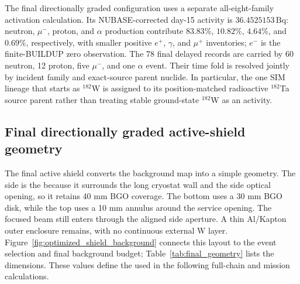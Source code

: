 \documentclass[11pt]{article}
\begin{document}
The final directionally graded configuration uses a separate all-eight-family
activation calculation.
Its NUBASE-corrected day-15 activity is $36.4525153\,\mathrm{Bq}$: neutron,
$\mu^-$, proton, and $\alpha$ production contribute $83.83\%$, $10.82\%$,
$4.64\%$, and $0.69\%$, respectively, with smaller positive $e^+$, $\gamma$,
and $\mu^+$ inventories; $e^-$ is the finite-BUILDUP zero observation. The 78
final delayed records are carried by 60 neutron, 12 proton, five $\mu^-$, and one
$\alpha$ event. Their time fold is resolved jointly by incident family and
exact-source parent nuclide. In particular, the one SIM lineage that starts as
$^{182}$W is assigned to its position-matched radioactive $^{182}$Ta source
parent rather than treating stable ground-state $^{182}$W as an activity.

\FloatBarrier

\subsection{Final directionally graded active-shield geometry}
\label{subsec:optimized_shield_results}

The final active shield converts the background map into a simple geometry. The side
is the  because it surrounds the long cryostat wall
and the side optical opening, so it retains 40 mm BGO coverage. The bottom uses a
30 mm BGO disk, while the top uses a 10 mm annulus around the service opening.
The focused beam still enters through the aligned side aperture. A thin Al/Kapton
outer enclosure remains, with no continuous external W layer.
Figure~\ref{fig:optimized_shield_background} connects this layout to the event
selection and final background budget; Table~\ref{tab:final_geometry} lists the
dimensions. These values define the  used in the following
full-chain and mission calculations.
\end{document}
